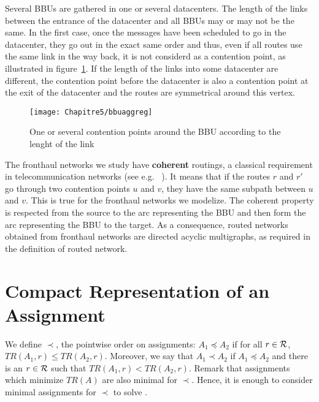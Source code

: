   
    Several BBUs are gathered in one or several datacenters. The length of the links between the entrance of the datacenter and all BBUs may or may not be the same. In the first case, once the messages have been scheduled to go in the datacenter, they go out in the exact same order and thus, even if all routes use the same link in the way back, it is not considerd as a contention point, as illustrated in figure~\ref{fig:bbuaggreg}. If the length of the links into some datacenter are different, the contention point before the datacenter is also a contention point at the exit of the datacenter and the routes are symmetrical around this vertex.

    \begin{figure}

  \centering
  \texttt{[image: Chapitre5/bbuaggreg]}


\caption{One or several contention points around the BBU according to the lenght of the link}
\label{fig:bbuaggreg}
\end{figure}

The fronthaul networks we study have \textbf{coherent} routings, a classical 
requirement in telecommunication networks (see e.g. ~\cite{schwiebert1996necessary}). It means that
if the routes $r$ and $r'$ go through two contention points $u$ and $v$, they have the same subpath
between $u$ and $v$.
This is true for the fronthaul networks we modelize. The coherent property is respected from the source 
to the arc representing the BBU and then form the arc representing the BBU to the target.
 As a consequence, routed networks obtained from fronthaul networks are directed acyclic multigraphs, as required in the definition of routed network.


\section{Compact Representation of an Assignment}

 We define $\prec$, the pointwise order on assignments: $A_1 \preceq A_2$ if for all $r\in {\cal R}$, $TR(A_1,r) \leq TR(A_2,r)$. Moreover, we say that $A_1 \prec A_2$ if $A_1 \preceq A_2$ and there is an $r \in \cal {R}$ such that  $TR(A_1,r) < TR(A_2,r)$. Remark that assignments which minimize $TR(A)$ are also minimal for $\prec$. Hence, it is enough to consider minimal assignments for $\prec$ to solve \spall.

